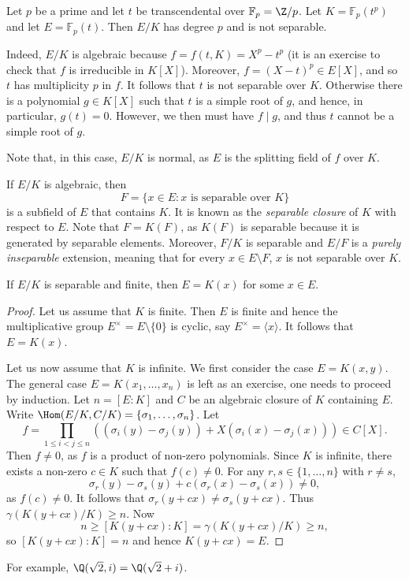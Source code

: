 
\begin{example}
    Let $p$ be a prime and let $t$ be transcendental over $\mathbb{F}_p=\Z/p$. Let $K=\mathbb{F}_p(t^p)$ and let $E=\mathbb{F}_p(t)$. Then $E/K$ has degree $p$ and is not separable.

    Indeed, $E/K$ is algebraic because $f=f(t,K)=X^p-t^p$ (it is an exercise to check that $f$ is irreducible in $K[X]$). Moreover, $f=(X-t)^p \in E[X]$, and so $t$ has multiplicity $p$ in $f$. It follows that $t$ is not separable over $K$. Otherwise there is a polynomial $g \in K[X]$ such that $t$ is a simple root of $g$, and hence, in particular, $g(t)=0$. However, we then must have $f \mid g$, and thus $t$ cannot be a simple root of $g$.

    Note that, in this case, $E/K$ is normal, as $E$ is the splitting field of $f$ over $K$.
\end{example}

\label{separable}
If $E/K$ is algebraic, then 
\[
    F=\{x\in E:x\text{ is separable over }K\}
\]
is a subfield of $E$ that contains $K$. It is known as 
the \emph{separable closure} of $K$ with respect to $E$. 
Note that $F=K(F)$, as
$K(F)$ is separable because it is generated by separable elements. Moreover, 
$F/K$ is separable and 
$E/F$ is a \emph{purely inseparable} extension, meaning that
for every $x\in E\setminus F$, $x$ is not separable over $K$. 

\begin{proposition}
\label{pro:monogenic}
    If $E/K$ is separable and finite, then $E=K(x)$ for some $x\in E$. 
\end{proposition}

\begin{proof}
    Let us assume that $K$ is finite. Then $E$ is finite and hence 
    the multiplicative group $E^{\times}=E\setminus\{0\}$ 
    is cyclic, say $E^{\times}=\langle x\rangle$. It follows
    that $E=K(x)$. 
    
    Let us now assume that $K$ is infinite. We first consider the case 
    $E=K(x,y)$. The general case $E=K(x_1,\dots,x_n)$ is left as an exercise, one needs to proceed by induction. 
    Let $n=[E:K]$ and 
    $C$ be an algebraic closure of $K$ containing $E$. 
    Write $\Hom(E/K,C/K)=\{\sigma_1,\dots,\sigma_n\}$. Let 
    \[
    f=\prod_{1\leq i<j\leq n}\left((\sigma_i(y)-\sigma_j(y))
    +X(\sigma_i(x)-\sigma_j(x))\right)\in C[X].
    \]
    Then $f\ne 0$, as $f$ is a product of non-zero polynomials. Since $K$ is infinite, 
    there exists a non-zero 
    $c\in K$ such that $f(c)\ne 0$. For any $r,s\in\{1,\dots,n\}$ with 
    $r\ne s$,
    \[
        \sigma_r(y)-\sigma_s(y)+c(\sigma_r(x)-\sigma_s(x))\ne 0,
    \]
    as $f(c)\ne0$. It follows that $\sigma_r(y+cx)\ne\sigma_s(y+cx)$. Thus $\gamma(K(y+cx)/K)\geq n$. 
    Now 
    \[
    n\geq [K(y+cx):K]=\gamma(K(y+cx)/K)\geq n,
    \]
    so $[K(y+cx):K]=n$ and
    hence $K(y+cx)=E$. 
\end{proof}

For example, $\Q(\sqrt{2},i)=\Q(\sqrt{2}+i)$. 
